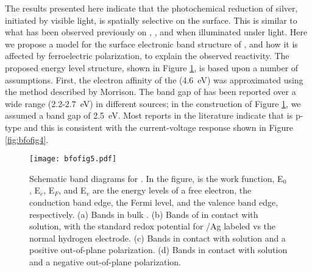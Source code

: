 The results presented here indicate that the photochemical reduction of silver, initiated by visible light, is spatially selective on the  surface. This is similar to what has been observed previously on , , and  when illuminated under  light.\cite{Burbure:2010go,Giocondi:2001bi,Giocondi:2003wc,Lowekamp:1998ks,Dunn:2007ja} Here we propose a model for the surface electronic band structure of , and how it is affected by ferroelectric polarization, to explain the observed reactivity. The proposed energy level structure, shown in Figure \ref{fig:bfofig5}, is based upon a number of assumptions. First, the electron affinity of the  (\SI{4.6}{\electronvolt}) was approximated using the method described by Morrison.\cite{Morrison:1980va} The band gap of  has been reported over a wide range (2.2-\SI{2.7}{\electronvolt}) in different sources;\cite{Basu:2008hd,Choi:2009gh,Gao:2006fg} in the construction of Figure \ref{fig:bfofig5}, we assumed a band gap of \SI{2.5}{\electronvolt}. Most reports in the literature indicate that  is p-type\cite{Vengalis:2008vi,Yang:2008fo} and this is consistent with the current-voltage response shown in Figure \ref{fig:bfofig4}.
\begin{figure}[htbp]
\begin{center}
\texttt{[image: bfofig5.pdf]}
\caption[Schematic band diagrams for ]{Schematic band diagrams for . In the figure,  is the work function, E$_0$, E$_c$, E$_F$, and E$_v$ are the energy levels of a free electron, the conduction band edge, the Fermi level, and the valence band edge, respectively. (a) Bands in bulk . (b) Bands of  in contact with solution, with the standard redox potential for /Ag labeled vs the normal hydrogen electrode. (c) Bands in contact with solution and a positive out-of-plane polarization. (d) Bands in contact with solution and a negative out-of-plane polarization.}
\label{fig:bfofig5}
\end{center}
\end{figure}


